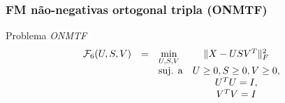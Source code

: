 \documentclass[10pt]{beamer}
\DeclarePairedDelimiter\norm{\lVert}{\rVert}
\begin{document}
\begin{frame}
  \frametitle{FM não-negativas ortogonal tripla (ONMTF)}


  \begin{block}{Problema \textit{ONMTF}}
    \begin{equation}
        \begin{array}{lclcl}
            \displaystyle \mathcal{F}_6(U, S, V) & = & \displaystyle \min_{U, S, V} & \norm{X - USV^T}^{2}_{F}      \\
                                                 &   & \text{suj. a}                & U \geq 0, S \geq 0, V \geq 0, \\
                                                 &   &                              & U^T U = I,                    \\
                                                 &   &                              & V^T V = I
        \end{array}   \nonumber
    \end{equation}
  \end{block}

\end{frame}


\end{document}
